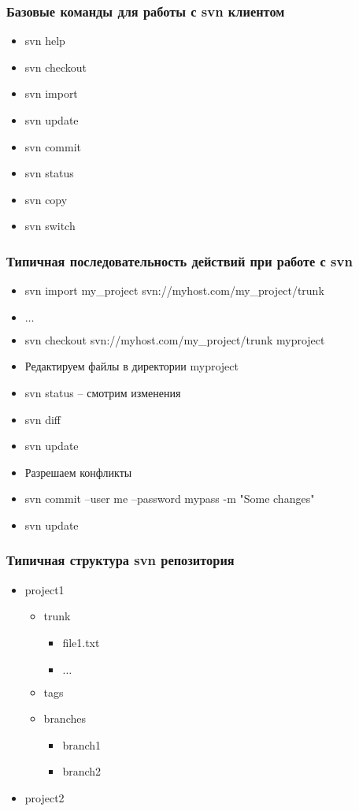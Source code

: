 \begin{frame}
 \frametitle{Базовые команды для работы с svn клиентом}
  \begin{itemize}
   \item svn help
   \item svn checkout 
   \item svn import
   \item svn update
   \item svn commit
   \item svn status
   \item svn copy
   \item svn switch
  \end{itemize}
\end{frame}

\begin{frame}
 \frametitle{Типичная последовательность действий при работе с svn}
 \begin{itemize}
  \item svn import my_project svn://myhost.com/my_project/trunk
  \item $\dots$
  \item svn checkout svn://myhost.com/my_project/trunk myproject
  \item Редактируем файлы в директории myproject
  \item svn status -- смотрим изменения
  \item svn diff
  \item svn update 
  \item Разрешаем конфликты
  \item svn commit --user me --password mypass -m "Some changes"
  \item svn update
 \end{itemize}
\end{frame}

\begin{frame}
 \frametitle{Типичная структура svn репозитория}
 \begin{itemize}
  \item project1
    \begin{itemize}
      \item trunk
        \begin{itemize}
          \item file1.txt
          \item $\dots$
        \end{itemize}
      \item tags
      \item branches
         \begin{itemize}
            \item branch1
            \item branch2
         \end{itemize}
     \end{itemize}
  \item project2

 \end{itemize}
\end{frame}


